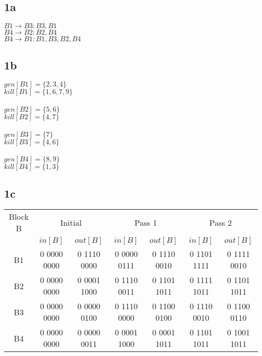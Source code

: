 \documentclass[10pt,a4paper]{article}
\author{Lucas Swartsenburg\\6174388}
\begin{document}
\subsection*{1a}
$B1 \rightarrow B3:{B3,B1}$ \\
$B4 \rightarrow B2:{B2,B4}$ \\
$B4 \rightarrow B1:{B1,B3,B2,B4}$

\subsection*{1b}
$gen[B1]= \{2,3,4\} $\\
$kill[B1]= \{1,6,7,9\} $\\
\\
$gen[B2]= \{5,6\} $\\
$kill[B2]= \{4,7\} $\\
\\
$gen[B3]= \{7\} $\\
$kill[B3]= \{4,6\} $\\
\\
$gen[B4]= \{8,9\} $\\
$kill[B4]= \{1,3\} $\\

\subsection*{1c}
\begin{tabular}{|c|c|c|c|c|c|c|}
\hline 
Block B   & \multicolumn{2}{|c|}{Initial}   & \multicolumn{2}{|c|}{Pass 1}     & \multicolumn{2}{|c|}{Pass 2}     \\  \cline{2-7}
          & $in[B]$        & $out[B]$       & $in[B]$        & $out[B]$        & $in[B]$        & $out[B]$        \\ 
\hline                                                                                                      
B1        & 0 0000 0000    & 0 1110 0000    & 0 0000 0111    &  0 1110 0010    & 0 1101 1111    &  0 1111 0010    \\ 
B2        & 0 0000 0000    & 0 0001 1000    & 0 1110 0011    &  0 1101 1011    & 0 1111 1011    &  0 1101 1011    \\ 
B3        & 0 0000 0000    & 0 0000 0100    & 0 1110 0000    &  0 1100 0100    & 0 1110 0010    &  0 1100 0110    \\ 
B4        & 0 0000 0000    & 0 0000 0011    & 0 0001 1000    &  0 0001 1011    & 0 1101 1011    &  0 1001 1011    \\ 
\hline 
\end{tabular} 
\end{document}
